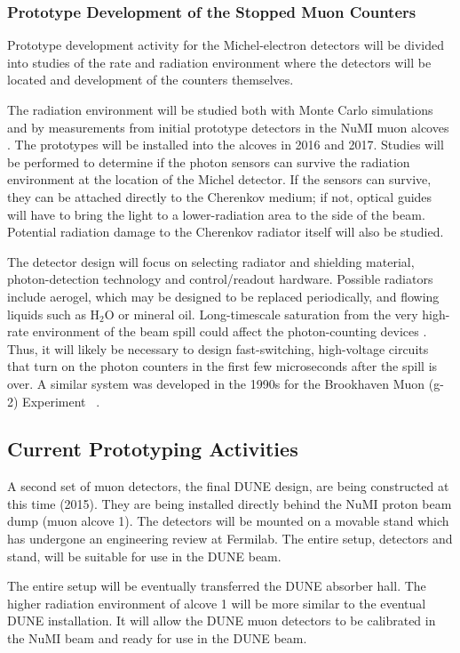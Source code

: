 \subsubsection{Prototype Development of the Stopped Muon Counters}

Prototype development activity for the Michel-electron detectors will
be divided into studies of the rate and radiation environment where
the detectors will be located and development of the counters
themselves. 

The radiation environment will be studied both with Monte Carlo 
simulations and by measurements from initial prototype detectors 
in the NuMI muon alcoves \cite{ref:NuMIBeamMonitors}.
The prototypes will be installed into the alcoves in 2016 and 2017.
Studies will be performed to determine if the photon sensors
can survive the radiation environment at the location of the Michel
detector. If the sensors can survive, they can be attached directly to
the Cherenkov medium; if not, optical guides will have to bring the
light to a lower-radiation area to the side of the beam. Potential
radiation damage to the Cherenkov radiator itself will also be
studied.

The detector design will focus on selecting radiator and shielding
material, photon-detection technology and control/readout
hardware. Possible radiators include aerogel, which may be designed to
be replaced periodically, and flowing liquids such as H$_2$O or
mineral oil. Long-timescale saturation from the very high-rate
environment of the beam spill could affect the photon-counting devices
\cite{ref:HighRateCounting}. Thus, it will likely be necessary to
design fast-switching, high-voltage circuits that turn on the photon
counters in the first few microseconds after the spill is over. A
similar system was developed in the 1990s for the Brookhaven Muon
(g-2) Experiment~\cite{ref:G2} .

\subsection{Current Prototyping Activities}

A second set of muon detectors, the final DUNE design, are being constructed at this time (2015). They are being installed directly behind the NuMI proton beam dump (muon alcove 1). The detectors will be mounted on a movable stand which has undergone an engineering review at Fermilab. The entire setup, detectors and stand, will be suitable for use in the DUNE beam.

The entire setup will be eventually transferred the DUNE absorber hall. The higher radiation environment of alcove 1 will be more similar to the eventual DUNE installation. It will allow the DUNE muon detectors to be calibrated in the NuMI beam and ready for use in the DUNE beam.

